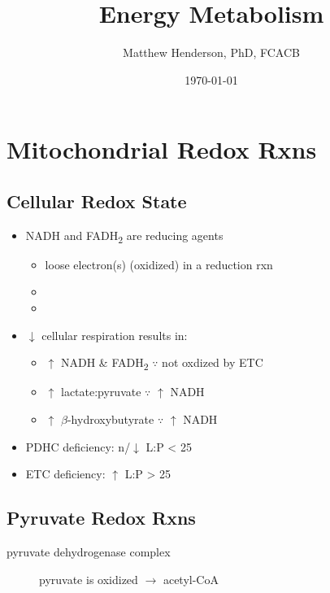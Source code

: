 \documentclass[12pt]{scrartcl}
\author{Matthew Henderson, PhD, FCACB}
\date{\today}
\title{Energy Metabolism}
\begin{document}
\maketitle
\setcounter{tocdepth}{2}
\tableofcontents



\section{Mitochondrial Redox Rxns}
\label{sec:org435ad2f}
\subsection{Cellular Redox State}
\label{sec:org8053b41}
\begin{itemize}
\item NADH and FADH\textsubscript{2} are reducing agents
\begin{itemize}
\item loose electron(s) (oxidized) in a reduction rxn
\item {}
\item {}
\end{itemize}
\item \(\downarrow\) cellular respiration results in:
\begin{itemize}
\item \(\uparrow\) NADH \& FADH\textsubscript{2} \(\because\) not oxdized by ETC
\item \(\uparrow\) lactate:pyruvate \(\because\) \(\uparrow\) NADH
\item \(\uparrow\) \(\beta\)-hydroxybutyrate  \(\because\) \(\uparrow\) NADH
\end{itemize}

\item PDHC deficiency: n/\(\downarrow\) L:P < 25
\item ETC deficiency: \(\uparrow\) L:P > 25
\end{itemize}

\subsection{Pyruvate Redox Rxns}
\label{sec:orgbb53423}

\begin{description}
\item[{pyruvate dehydrogenase complex}] pyruvate is oxidized \(\to\) acetyl-CoA
\end{description}
\end{document}
